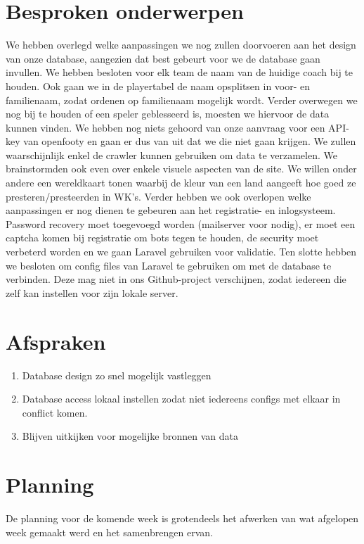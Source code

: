 \documentclass[11pt, a4paper]{article}
\begin{document}
\section{Besproken onderwerpen}
We hebben overlegd welke aanpassingen we nog zullen doorvoeren aan het design van onze database, aangezien dat best gebeurt voor we de database gaan invullen. We hebben besloten voor elk team de naam van de huidige coach bij te houden. Ook gaan we in de playertabel de naam opsplitsen in voor- en familienaam, zodat ordenen op familienaam mogelijk wordt. Verder overwegen we nog bij te houden of een speler geblesseerd is, moesten we hiervoor de data kunnen vinden.
\newline
We hebben nog niets gehoord van onze aanvraag voor een API-key van openfooty en gaan er dus van uit dat we die niet gaan krijgen. We zullen waarschijnlijk enkel de crawler kunnen gebruiken om data te verzamelen.
\newline
We brainstormden ook even over enkele visuele aspecten van de site. We willen onder andere een wereldkaart tonen waarbij de kleur van een land aangeeft hoe goed ze presteren/presteerden in WK's.
\newline
Verder hebben we ook overlopen welke aanpassingen er nog dienen te gebeuren aan het registratie- en inlogsysteem. Password recovery moet toegevoegd worden (mailserver voor nodig), er moet een captcha komen bij registratie om bots tegen te houden, de security moet verbeterd worden en we gaan Laravel gebruiken voor validatie.
\newline
Ten slotte hebben we besloten om config files van Laravel te gebruiken om met de database te verbinden. Deze mag niet in ons Github-project verschijnen, zodat iedereen die zelf kan instellen voor zijn lokale server.

\section{Afspraken}
\begin{enumerate}
\item Database design zo snel mogelijk vastleggen
\item Database access lokaal instellen zodat niet iedereens configs met elkaar in conflict komen.
\item Blijven uitkijken voor mogelijke bronnen van data
\end{enumerate}


\section{Planning}
De planning voor de komende week is grotendeels het afwerken van wat afgelopen week gemaakt werd en het samenbrengen ervan.
\end{document}
